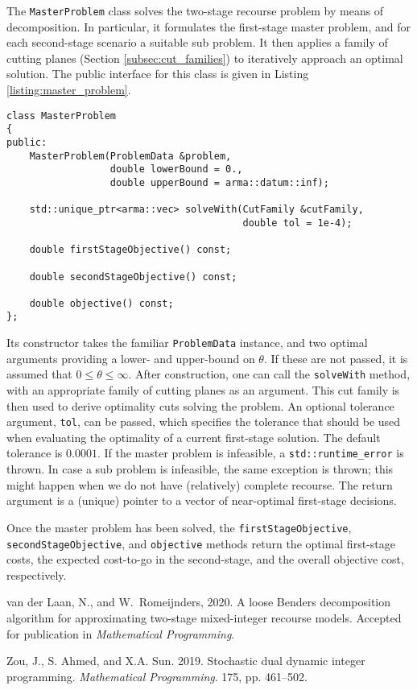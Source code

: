 \documentclass[12pt, english]{article}
\begin{document}
The \texttt{MasterProblem} class solves the two-stage recourse problem by means of decomposition. In particular, it formulates the first-stage master problem, and for each second-stage scenario a suitable sub problem. It then applies a family of cutting planes (Section \ref{subsec:cut_families}) to iteratively approach an optimal solution. The public interface for this class is given in Listing \ref{listing:master_problem}.
\begin{lstlisting}[caption={Public interface of the \texttt{MasterProblem} class.}, 
                   label={listing:master_problem}]
class MasterProblem
{
public:
	MasterProblem(ProblemData &problem,
				  double lowerBound = 0.,
				  double upperBound = arma::datum::inf);
		
	std::unique_ptr<arma::vec> solveWith(CutFamily &cutFamily,
	                                     double tol = 1e-4);
	
	double firstStageObjective() const;
	
	double secondStageObjective() const;
	
	double objective() const;
};
\end{lstlisting}
Its constructor takes the familiar \texttt{ProblemData} instance, and two optimal arguments providing a lower- and upper-bound on $\theta$. If these are not passed, it is assumed that $0 \le \theta \le \infty$. After construction, one can call the \texttt{solveWith} method, with an appropriate family of cutting planes as an argument. This cut family is then used to derive optimality cuts solving the problem. An optional tolerance argument, \texttt{tol}, can be passed, which specifies the tolerance that should be used when evaluating the optimality of a current first-stage solution. The default tolerance is $0.0001$. If the master problem is infeasible, a \texttt{std::runtime\_error} is thrown. In case a sub problem is infeasible, the same exception is thrown; this might happen when we do not have (relatively) complete recourse. The return argument is a (unique) pointer to a vector of near-optimal first-stage decisions.

Once the master problem has been solved, the \texttt{firstStageObjective}, \texttt{secondStageObjective}, and \texttt{objective} methods return the optimal first-stage costs, the expected cost-to-go in the second-stage, and the overall objective cost, respectively.



\begin{thebibliography}{9}

	van der Laan, N., and W.\ Romeijnders, 2020. A loose Benders decomposition algorithm for approximating two-stage mixed-integer recourse models. Accepted for publication in \emph{Mathematical Programming}.

	Zou, J., S. Ahmed, and X.A. Sun. 2019. Stochastic dual dynamic integer programming. \emph{Mathematical Programming}. 175, pp. 461--502.
	
\end{thebibliography}
	
\end{document}
